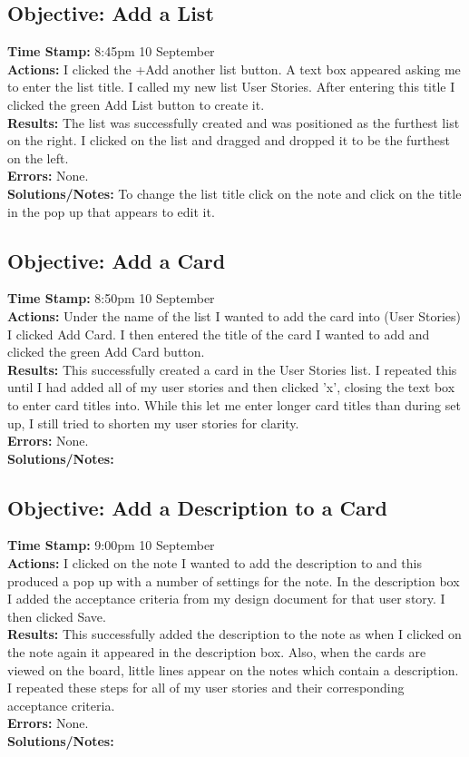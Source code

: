 \documentclass{article}
\begin{document}
\begin{FlushLeft}
\subsection{Objective: Add a List}
\textbf{Time Stamp:} 8:45pm 10 September\\
\textbf{Actions:} I clicked the +Add another list button. A text box appeared asking me to enter the list title. I called my new list User Stories. After entering this title I clicked the green Add List button to create it. \\
\textbf{Results:} The list was successfully created and was positioned as the furthest list on the right. I clicked on the list and dragged and dropped it to be the furthest on the left. \\
\textbf{Errors:} None.\\
\textbf{Solutions/Notes:} To change the list title click on the note and click on the title in the pop up that appears to edit it.\\

\subsection{Objective: Add a Card}
\textbf{Time Stamp:} 8:50pm 10 September\\
\textbf{Actions:} Under the name of the list I wanted to add the card into (User Stories) I clicked Add Card. I then entered the title of the card I wanted to add and clicked the green Add Card button.\\
\textbf{Results:} This successfully created a card in the User Stories list. I repeated this until I had added all of my user stories and then clicked 'x', closing the text box to enter card titles into. While this let me enter longer card titles than during set up, I still tried to shorten my user stories for clarity.\\
\textbf{Errors:} None.\\
\textbf{Solutions/Notes:}\\

\subsection{Objective: Add a Description to a Card}
\textbf{Time Stamp:} 9:00pm 10 September\\
\textbf{Actions:} I clicked on the note I wanted to add the description to and this produced a pop up with a number of settings for the note. In the description box I added the acceptance criteria from my design document for that user story. I then clicked Save.\\
\textbf{Results:} This successfully added the description to the note as when I clicked on the note again it appeared in the description box. Also, when the cards are viewed on the board, little lines appear on the notes which contain a description. I repeated these steps for all of my user stories and their corresponding acceptance criteria.\\
\textbf{Errors:} None.\\
\textbf{Solutions/Notes:}\\


\end{FlushLeft}
\end{document}
